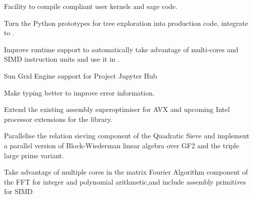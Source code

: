 \begin{workpackage}
\begin{wpdelivs}
  \begin{wpdeliv}[due=3,miles=startup,id=pythran-sage,dissem=PU,nature=DEM,lead=UJF]
      {Facility to compile \Pythran compliant user kernels and sage code.}
  \end{wpdeliv}
  \begin{wpdeliv}[due=3,miles=startup,id=sage-paral-tree,dissem=PU,nature=DEM,lead=PS]
      {Turn the Python prototypes for tree exploration into production code, integrate to \Sage.}
\end{wpdeliv}
  \begin{wpdeliv}[due=9,miles=startup,id=pythran-cython,dissem=PU,nature=DEM,lead=LL]
      {Improve \Pythran runtime support to automatically take advantage of multi-cores and SIMD instruction units and use it in \Cython.}
  \end{wpdeliv}
  \begin{wpdeliv}[due=12,miles=startup,id=SGE-jupyter,dissem=PU,nature=OTHER,lead=USH]
      {Sun Grid Engine support for Project Jupyter Hub}
  \end{wpdeliv}
  \begin{wpdeliv}[due=12,miles=startup,id=pythran-typing,dissem=PU,nature=DEM, lead=UJF]
      {Make \Pythran typing better to improve error information.}
  \end{wpdeliv}
  \begin{wpdeliv}[due=18,miles=proto1,id=MPIRsuperoptimiser,dissem=PU,nature=DEM,lead=UK]
      {Extend the existing assembly superoptimiser for AVX and upcoming Intel
        processor extensions for the \MPIR library.}
\end{wpdeliv}
  \begin{wpdeliv}[due=18,miles=proto1,id=QS-linalg,dissem=PU,nature=DEM,lead=UK]
      {Parallelise the relation sieving component of the Quadratic Sieve and implement a parallel version of Block-Wiederman linear algebra over GF2 and the triple large prime variant.}
  \end{wpdeliv}
  \begin{wpdeliv}[due=18,miles=proto1,id=FFT,dissem=PU,nature=DEM, lead=UK]
    {Take advantage of multiple cores in the matrix Fourier Algorithm component of the FFT
      for integer and polynomial arithmetic,and include assembly primitives for SIMD
}
\end{wpdeliv}
\end{wpdelivs}
\end{workpackage}
